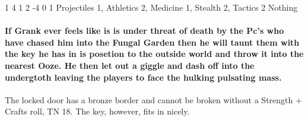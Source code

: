 \begin{multicols}{2}
\begin{exampletext}
\end{exampletext}

\jelly

\jelly

\label{grank}
{1}%
{4}%
{{1}%
{2}%
{-4}}%
{0}%
{1}%
{Projectiles 1, Athletics 2, Medicine 1, Stealth 2, Tactics 2%
}%
{Nothing}%
{}
\paragraph{If Grank ever feels like is is under threat of death by the Pc's who have chased him into the Fungal Garden then he will taunt them with the key he has in is posetion to the outside world and throw it into the nearest  Ooze. He then let out a giggle and dash off into the undergtoth leaving the players to face the hulking pulsating mass.}   


The locked door has a bronze border and cannot be broken without a Strength + Crafts roll, TN 18.
The key, however, fits in nicely.



\end{multicols}

